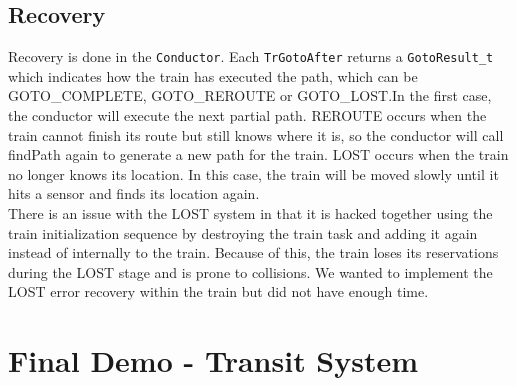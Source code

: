 \documentclass[12pt]{article}
\begin{document}
\subsection{Recovery}
Recovery is done in the \texttt{Conductor}. Each \texttt{TrGotoAfter} returns a \texttt{GotoResult\_t} which indicates
how the train has executed the path, which can be GOTO\_COMPLETE, GOTO\_REROUTE or GOTO\_LOST.In the first case, the
conductor will execute the next partial path. REROUTE occurs when the train cannot finish its route but still knows
where it is, so the conductor will call findPath again to generate a new path for the train. LOST occurs when the train
no longer knows its location. In this case, the train will be moved slowly until it hits a sensor and finds its location
again.
\\
There is an issue with the LOST system in that it is hacked together using the train initialization sequence by destroying 
the train task and adding it again instead of internally to the train. Because of this, the train loses its reservations 
during the LOST stage and is prone to collisions. We wanted to implement the LOST error recovery within the train but did 
not have enough time.
\\[2\baselineskip]
\section{Final Demo - Transit System}
\end{document}
